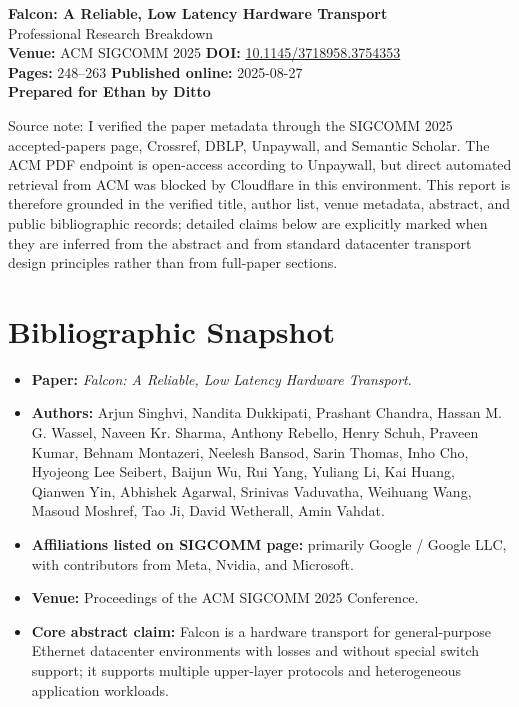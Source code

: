 \documentclass[11pt]{article}
\newcommand{\note}[1]{\vspace{0.2em}\noindent\textcolor{muted}{\small #1}\vspace{0.4em}}
\begin{document}
\begin{center}
{\LARGE\bfseries Falcon: A Reliable, Low Latency Hardware Transport}\\[0.4em]
{\large Professional Research Breakdown}\\[0.6em]
\textbf{Venue:} ACM SIGCOMM 2025 \quad
\textbf{DOI:} \href{https://doi.org/10.1145/3718958.3754353}{10.1145/3718958.3754353}\\
\textbf{Pages:} 248--263 \quad
\textbf{Published online:} 2025-08-27\\[0.6em]
\textbf{Prepared for Ethan by Ditto}
\end{center}

\note{Source note: I verified the paper metadata through the SIGCOMM 2025 accepted-papers page, Crossref, DBLP, Unpaywall, and Semantic Scholar. The ACM PDF endpoint is open-access according to Unpaywall, but direct automated retrieval from ACM was blocked by Cloudflare in this environment. This report is therefore grounded in the verified title, author list, venue metadata, abstract, and public bibliographic records; detailed claims below are explicitly marked when they are inferred from the abstract and from standard datacenter transport design principles rather than from full-paper sections.}

\section{Bibliographic Snapshot}

\begin{itemize}
  \item \textbf{Paper:} \emph{Falcon: A Reliable, Low Latency Hardware Transport}.
  \item \textbf{Authors:} Arjun Singhvi, Nandita Dukkipati, Prashant Chandra, Hassan M. G. Wassel, Naveen Kr. Sharma, Anthony Rebello, Henry Schuh, Praveen Kumar, Behnam Montazeri, Neelesh Bansod, Sarin Thomas, Inho Cho, Hyojeong Lee Seibert, Baijun Wu, Rui Yang, Yuliang Li, Kai Huang, Qianwen Yin, Abhishek Agarwal, Srinivas Vaduvatha, Weihuang Wang, Masoud Moshref, Tao Ji, David Wetherall, Amin Vahdat.
  \item \textbf{Affiliations listed on SIGCOMM page:} primarily Google / Google LLC, with contributors from Meta, Nvidia, and Microsoft.
  \item \textbf{Venue:} Proceedings of the ACM SIGCOMM 2025 Conference.
  \item \textbf{Core abstract claim:} Falcon is a hardware transport for general-purpose Ethernet datacenter environments with losses and without special switch support; it supports multiple upper-layer protocols and heterogeneous application workloads.
\end{itemize}
\end{document}
